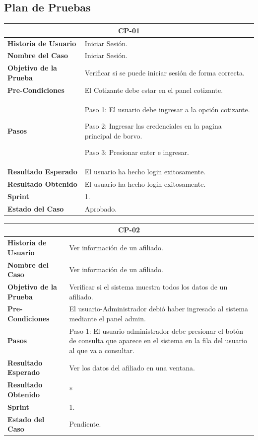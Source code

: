 \documentclass[12pt,a4paper]{article}
\begin{document}
\subsection{Plan de Pruebas}
\begin{center}
\begin{tabular}{|m{5cm}|m{9cm}|}
\hline
\multicolumn{2}{|c|}{\textbf{CP-01}} \\
\hline
\textbf{Historia de Usuario} & Iniciar Sesión. \\
\hline
\textbf{Nombre del Caso} & Iniciar Sesión. \\
\hline
\textbf{Objetivo de la Prueba} & Verificar si se puede iniciar sesión de forma correcta. \\
\hline
\textbf{Pre-Condiciones} & El Cotizante debe estar en el panel cotizante. \\
\hline
\textbf{Pasos} & Paso 1: El usuario debe ingresar a la opción cotizante.

Paso 2: Ingresar las credenciales en la pagina principal de borvo.

Paso 3: Presionar enter e ingresar.
 \\
\hline
\textbf{Resultado Esperado} & El usuario ha hecho login exitosamente. \\
\hline
\textbf{Resultado Obtenido} & El usuario ha hecho login exitosamente. \\
\hline
\textbf{Sprint} & 1. \\
\hline
\textbf{Estado del Caso} & Aprobado. \\
\hline
\end{tabular}
\vspace{5mm}

\begin{tabular}{|m{5cm}|m{9cm}|}
\hline
\multicolumn{2}{|c|}{\textbf{CP-02}} \\
\hline
\textbf{Historia de Usuario} & Ver información de un afiliado. \\
\hline
\textbf{Nombre del Caso} & Ver información de un afiliado. \\
\hline
\textbf{Objetivo de la Prueba} & Verificar si el sistema muestra todos los datos de un afiliado.\\
\hline
\textbf{Pre-Condiciones} & El usuario-Administrador debió haber ingresado al sistema mediante el panel admin. \\
\hline
\textbf{Pasos} & Paso 1: El usuario-administrador debe presionar el botón de consulta que aparece en el sistema en la fila del usuario al que va a consultar.
 \\
\hline
\textbf{Resultado Esperado} & Ver los datos del afiliado en una ventana. \\
\hline
\textbf{Resultado Obtenido} & * \\
\hline
\textbf{Sprint} & 1. \\
\hline
\textbf{Estado del Caso} & Pendiente. \\
\hline
\end{tabular}
\vspace{5mm}


\end{center}
\end{document}
